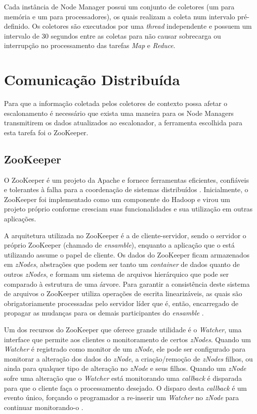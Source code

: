 Cada instância de Node Manager possui um conjunto de coletores (um para memória e um para processadores), os quais realizam a coleta num intervalo pré-definido. Os coletores são executados por uma \textit{thread} independente e possuem um intervalo de 30 segundos entre as coletas para não causar sobrecarga ou interrupção no  processamento das tarefas \textit{Map} e \textit{Reduce}.

\section{Comunicação Distribuída}
\label{sec:zookeeper}

Para que a informação coletada pelos coletores de contexto possa afetar o escalonamento é necessário que exista uma maneira para os Node Managers transmitirem os dados atualizados ao escalonador, a ferramenta escolhida para esta tarefa foi o ZooKeeper.

\subsection{ZooKeeper}
O ZooKeeper é um projeto da Apache e fornece ferramentas eficientes, confiáveis e tolerantes à falha para a coordenação de sistemas distribuídos \cite{Hunt2010}. Inicialmente, o ZooKeeper foi implementado como um componente do Hadoop e virou um projeto próprio conforme cresciam suas funcionalidades e sua utilização em outras aplicações. 

A arquitetura utilizada no ZooKeeper é a de cliente-servidor, sendo o servidor o próprio ZooKeeper (chamado de \textit{ensamble}), enquanto a aplicação que o está utilizando assume o papel de cliente. Os dados do ZooKeeper ficam armazenados em \textit{zNodes}, abstrações que podem ser tanto um \textit{container} de dados quanto de outros \textit{zNodes}, e formam um sistema de arquivos hierárquico que pode ser comparado à estrutura de uma árvore. Para garantir a consistência deste sistema de arquivos o ZooKeeper utiliza operações de escrita linearizáveis, as quais são obrigatoriamente processadas pelo servidor líder que é, então, encarregado de propagar as mudanças para os demais participantes do \textit{ensamble} \cite{Pham}.

Um dos recursos do ZooKeeper que oferece grande utilidade é o \textit{Watcher}, uma interface que permite aos clientes o monitoramento de certos \textit{zNodes}. Quando um \textit{Watcher} é registrado como monitor de um \textit{zNode}, ele pode ser configurado para monitorar a alteração dos dados do \textit{zNode}, a criação/remoção de \textit{zNodes} filhos, ou ainda para qualquer tipo de alteração no \textit{zNode} e seus filhos. Quando um \textit{zNode} sofre uma alteração que o \textit{Watcher} está monitorando uma \textit{callback} é disparada para que o cliente faça o processamento desejado. O disparo desta \textit{callback} é um evento único, forçando o programador a re-inserir um \textit{Watcher} no \textit{zNode} para continuar monitorando-o \cite{BookHadoop}.

